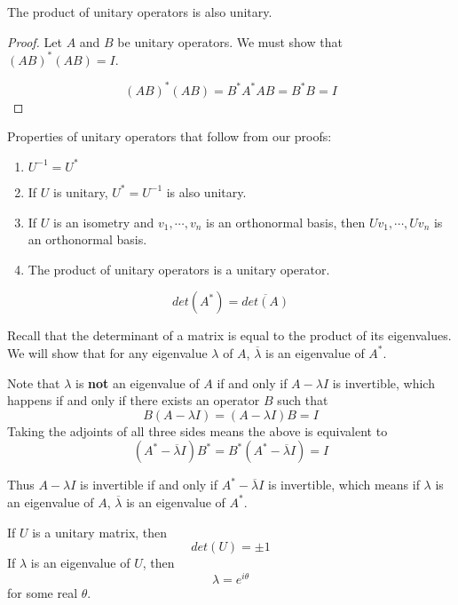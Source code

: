 \begin{theorem}
The product of unitary operators is also unitary. 
\end{theorem}

\begin{proof}
Let $A$ and $B$ be unitary operators. We must show that $(AB)^{*} (AB) = I$. 

$$(AB)^{*}(AB) = B^{*} A^{*} A B = B^{*} B = I$$
\end{proof}

Properties of unitary operators that follow from our proofs: 
\begin{enumerate}
	\item $U^{-1} = U^{*}$ 
	\item If $U$ is unitary, $U^{*} = U^{-1}$ is also unitary. 
	\item If $U$ is an isometry and $v_{1}, \cdots, v_{n}$ is an orthonormal basis, then $Uv_{1}, \cdots, Uv_{n}$ is an orthonormal basis. 
	\item The product of unitary operators is a unitary operator. 
\end{enumerate}

\begin{lemma}
$$det(A^{*}) = \overline{det(A)}$$
\end{lemma}

\begin{lproof}
Recall that the determinant of a matrix is equal to the product of its eigenvalues. We will show that for any eigenvalue $\lambda$ of $A$, $\overline{\lambda}$ is an eigenvalue of $A^{*}$. 

Note that $\lambda$ is \textbf{not} an eigenvalue of $A$ if and only if $A - \lambda I$ is invertible, which happens if and only if there exists an operator $B$ such that 
$$B(A - \lambda I) = (A - \lambda I)B = I$$
Taking the adjoints of all three sides means the above is equivalent to 
$$(A^{*} - \overline{\lambda}I)B^{*} = B^{*} (A^{*} - \overline{\lambda}I) = I$$

Thus $A - \lambda I$ is invertible if and only if $A^{*} - \overline{\lambda}I$ is invertible, which means if $\lambda$ is an eigenvalue of $A$, $\overline{\lambda}$ is an eigenvalue of $A^{*}$. 
\end{lproof}

\begin{theorem}
If $U$ is a unitary matrix, then 
$$ det(U) = \pm 1$$
If $\lambda$ is an eigenvalue of $U$, then 
$$\lambda = e^{i \theta}$$
for some real $\theta$. 
\end{theorem}

